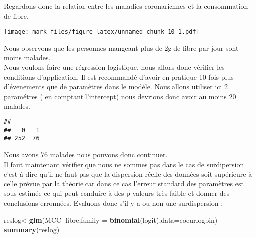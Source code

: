 \documentclass[
]{article}
\newenvironment{Shaded}{\begin{snugshade}}{\end{snugshade}}
\newcommand{\DataTypeTok}[1]{\textcolor[rgb]{0.13,0.29,0.53}{#1}}
\newcommand{\KeywordTok}[1]{\textcolor[rgb]{0.13,0.29,0.53}{\textbf{#1}}}
\newcommand{\NormalTok}[1]{#1}
\newcommand{\OperatorTok}[1]{\textcolor[rgb]{0.81,0.36,0.00}{\textbf{#1}}}
\begin{document}
Regardons donc la relation entre les maladies coronariennes et la
consommation de fibre.\\

\begin{Shaded}
\end{Shaded}

\texttt{[image: mark\_files/figure-latex/unnamed-chunk-10-1.pdf]}

Nous observons que les personnes mangeant plus de 2g de fibre par jour
sont moins malades.\\

Nous voulons faire une régression logistique, nous allons donc vérifier
les conditions d'application. Il est recommandé d'avoir en pratique 10
fois plus d'évenements que de paramètres dans le modèle. Nous allons
utiliser ici 2 paramétres ( en comptant l'intercept) nous devrions donc
avoir au moins 20 malades.

\begin{Shaded}
\end{Shaded}

\begin{verbatim}
## 
##   0   1 
## 252  76
\end{verbatim}

Nous avons 76 malades nous pouvons donc continuer.\\

Il faut maintenant vérifier que nous ne sommes pas dans le cas de
surdipersion c'est à dire qu'il ne faut pas que la dispersion réelle des
données soit supérieure à celle prévue par la théorie car dans ce cas
l'erreur standard des paramètres est sous-estimée ce qui peut conduire à
des p-valeurs très faible et donner des conclusions erronnées. Evaluons
donc s'il y a ou non une surdispersion :

\begin{Shaded}
\begin{Highlighting}[]
\NormalTok{reslog<-}\KeywordTok{glm}\NormalTok{(MCC}\OperatorTok{~}\NormalTok{fibre,}\DataTypeTok{family =} \KeywordTok{binomial}\NormalTok{(logit),}\DataTypeTok{data=}\NormalTok{coeurlogbin)}
\KeywordTok{summary}\NormalTok{(reslog)}
\end{Highlighting}
\end{Shaded}
\end{document}
